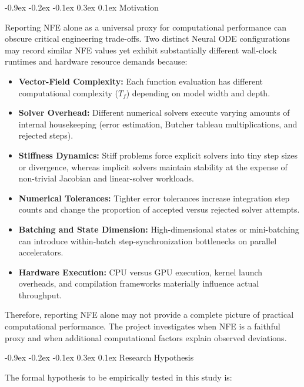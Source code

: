 \documentclass[10pt,a4paper]{article}
\makeatletter
\renewcommand{\section}{\@startsection{section}{1}{\z@}%
  {-0.9ex \@plus -0.2ex \@minus -0.1ex}%
  {0.3ex \@plus 0.1ex}%
  {\normalfont\normalsize\bfseries}}
\makeatother
\begin{document}
\section{Motivation}

Reporting NFE alone as a universal proxy for computational performance can obscure critical engineering trade-offs. Two distinct Neural ODE configurations may record similar NFE values yet exhibit substantially different wall-clock runtimes and hardware resource demands because:
\begin{itemize}
    \item \textbf{Vector-Field Complexity:} Each function evaluation has different computational complexity ($T_f$) depending on model width and depth.
    \item \textbf{Solver Overhead:} Different numerical solvers execute varying amounts of internal housekeeping (error estimation, Butcher tableau multiplications, and rejected steps).
    \item \textbf{Stiffness Dynamics:} Stiff problems force explicit solvers into tiny step sizes or divergence, whereas implicit solvers maintain stability at the expense of non-trivial Jacobian and linear-solver workloads.
    \item \textbf{Numerical Tolerances:} Tighter error tolerances increase integration step counts and change the proportion of accepted versus rejected solver attempts.
    \item \textbf{Batching and State Dimension:} High-dimensional states or mini-batching can introduce within-batch step-synchronization bottlenecks on parallel accelerators.
    \item \textbf{Hardware Execution:} CPU versus GPU execution, kernel launch overheads, and compilation frameworks materially influence actual throughput.
\end{itemize}
Therefore, reporting NFE alone may not provide a complete picture of practical computational performance. The project investigates when NFE is a faithful proxy and when additional computational factors explain observed deviations.

\section{Research Hypothesis}

The formal hypothesis to be empirically tested in this study is:

\vspace{0.2em}
\noindent{}
\vspace{0.2em}
\end{document}
